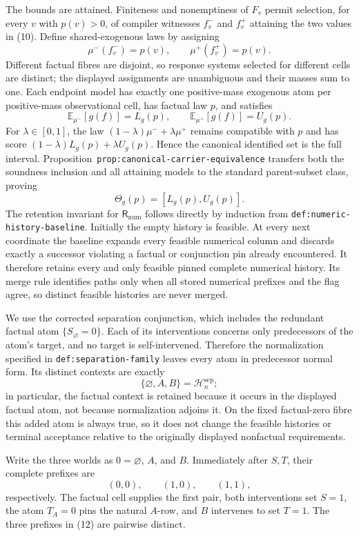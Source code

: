 The bounds are attained. Finiteness and nonemptiness of \(F_v\) permit selection, for every \(v\) with \(p(v)>0\), of compiler witnesses \(f_v^-\) and \(f_v^+\) attaining the two values in (10). Define shared-exogenous laws by assigning
\[
 \mu^-(f_v^-)=p(v),
 \qquad
 \mu^+(f_v^+)=p(v).
\]
Different factual fibres are disjoint, so response systems selected for different cells are distinct; the displayed assignments are unambiguous and their masses sum to one. Each endpoint model has exactly one positive-mass exogenous atom per positive-mass observational cell, has factual law \(p\), and satisfies
\[
 \mathbb E_{\mu^-}[g(f)]=L_g(p),
 \qquad
 \mathbb E_{\mu^+}[g(f)]=U_g(p).
\]
For \(\lambda\in[0,1]\), the law \((1-\lambda)\mu^-+\lambda\mu^+\) remains compatible with \(p\) and has score \((1-\lambda)L_g(p)+\lambda U_g(p)\). Hence the canonical identified set is the full interval. Proposition~\texttt{prop:canonical-carrier-equivalence} transfers both the soundness inclusion and all attaining models to the standard parent-subset class, proving
\[
 \Theta_g(p)=[L_g(p),U_g(p)].
\]
The retention invariant for \(\mathsf R_{\mathrm{num}}\) follows directly by induction from \texttt{def:numeric-history-baseline}. Initially the empty history is feasible. At every next coordinate the baseline expands every feasible numerical column and discards exactly a successor violating a factual or conjunction pin already encountered. It therefore retains every and only feasible pinned complete numerical history. Its merge rule identifies paths only when all stored numerical prefixes and the flag agree, so distinct feasible histories are never merged.

We use the corrected separation conjunction, which includes the redundant factual atom \(\{S_{\varnothing}=0\}\). Each of its interventions concerns only predecessors of the atom's target, and no target is self-intervened. Therefore the normalization specified in \texttt{def:separation-family} leaves every atom in predecessor normal form. Its distinct contexts are exactly
\[
 \{\varnothing,A,B\}=\mathcal H_n^{\mathrm{sep}};
\]
in particular, the factual context is retained because it occurs in the displayed factual atom, not because normalization adjoins it. On the fixed factual-zero fibre this added atom is always true, so it does not change the feasible histories or terminal acceptance relative to the originally displayed nonfactual requirements.

Write the three worlds as \(0=\varnothing\), \(A\), and \(B\). Immediately after \(S,T\), their complete prefixes are
\[
 (0,0),
 \qquad
 (1,0),
 \qquad
 (1,1),
 \tag{12}
\]
respectively. The factual cell supplies the first pair, both interventions set \(S=1\), the atom \(T_A=0\) pins the natural \(A\)-row, and \(B\) intervenes to set \(T=1\). The three prefixes in (12) are pairwise distinct.


